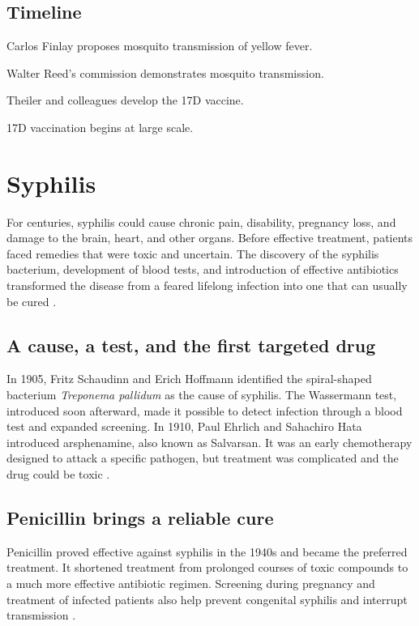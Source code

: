 \documentclass[12pt,oneside]{book}
\begin{document}
\section*{Timeline}
\begin{description}[leftmargin=2.3cm,style=nextline]
  \item[1881] Carlos Finlay proposes mosquito transmission of yellow fever.
  \item[1900] Walter Reed's commission demonstrates mosquito transmission.
  \item[1937] Theiler and colleagues develop the 17D vaccine.
  \item[1938] 17D vaccination begins at large scale.
\end{description}

\chapter[Syphilis]{Syphilis}

For centuries, syphilis could cause chronic pain, disability, pregnancy loss,
and damage to the brain, heart, and other organs. Before effective treatment,
patients faced remedies that were toxic and uncertain. The discovery of the
syphilis bacterium, development of blood tests, and introduction of effective
antibiotics transformed the disease from a feared lifelong infection into one
that can usually be cured \cite{cdcSyphilisTimeline,cdcSyphilisHistory}.

\section{A cause, a test, and the first targeted drug}
In 1905, Fritz Schaudinn and Erich Hoffmann identified the spiral-shaped
bacterium \emph{Treponema pallidum} as the cause of syphilis. The Wassermann
test, introduced soon afterward, made it possible to detect infection through
a blood test and expanded screening. In 1910, Paul Ehrlich and Sahachiro Hata
introduced arsphenamine, also known as Salvarsan. It was an early
chemotherapy designed to attack a specific pathogen, but treatment was
complicated and the drug could be toxic \cite{cdcSyphilisTimeline}.

\section{Penicillin brings a reliable cure}
Penicillin proved effective against syphilis in the 1940s and became the
preferred treatment. It shortened treatment from prolonged courses of toxic
compounds to a much more effective antibiotic regimen. Screening during
pregnancy and treatment of infected patients also help prevent congenital
syphilis and interrupt transmission \cite{cdcSyphilisTimeline,cdcSyphilisHistory}.
\end{document}
